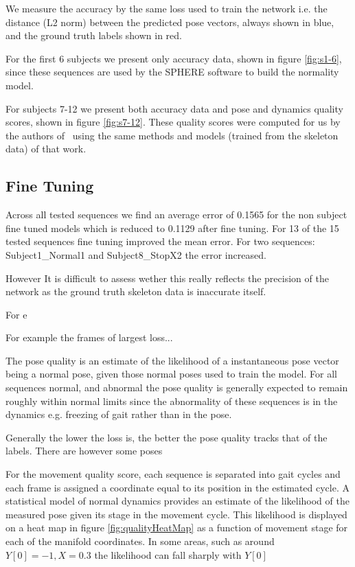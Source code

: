 \documentclass[11pt]{article} %
\begin{document}
We measure the accuracy by the same loss used to train the network i.e. the distance (L2 norm) between the predicted pose vectors, always shown in blue, and the ground truth labels shown in red. 

For the first 6 subjects we present only accuracy data, shown in figure \ref{fig:s1-6}, since these sequences are used by the SPHERE software to build the normality model.

For subjects 7-12 we present both accuracy data and pose and dynamics quality scores, shown in figure \ref{fig:s7-12}. These quality scores were computed for us by the authors of~\cite{Paiement} using the same methods and models (trained from the skeleton data) of that work. 


\subsection{Fine Tuning}

Across all tested sequences we find an average error of 0.1565 for the non subject fine tuned models which is reduced to 0.1129 after fine tuning. For 13 of the 15 tested sequences fine tuning improved the mean error. For two sequences: Subject1\_Normal1 and Subject8\_StopX2 the error increased.


However It is difficult to assess wether this really reflects the precision of the network as the ground truth skeleton data is inaccurate itself.

For e

 For example the frames of largest loss...

The pose quality is an estimate of the likelihood of a instantaneous pose vector being a normal pose, given those normal poses used to train the model. For all sequences normal, and abnormal the pose quality is generally expected to remain roughly within normal limits since the abnormality of these sequences is in the dynamics e.g. freezing of gait rather than in the pose. 

Generally the lower the loss is, the better the pose quality tracks that of the labels. There are however some poses 

For the movement quality score, each sequence is separated into gait cycles and each frame is assigned a coordinate equal to its position in the estimated cycle. A statistical model of normal dynamics provides an estimate of the likelihood of the measured pose given its stage in the movement cycle. This likelihood is displayed on a heat map in figure \ref{fig:qualityHeatMap} as a function of movement stage for each of the manifold coordinates. In some areas, such as around $Y[0]=-1,X=0.3$  the likelihood can fall sharply with $Y[0]$  
\end{document}
